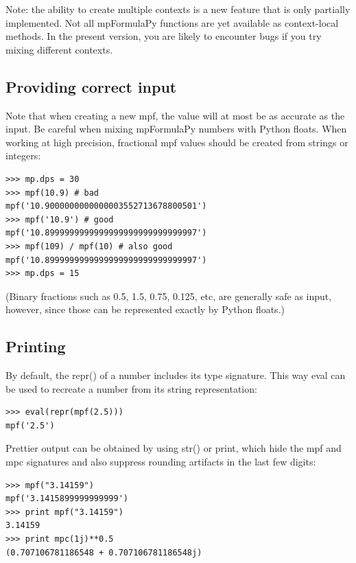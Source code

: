 Note: the ability to create multiple contexts is a new feature that is only partially implemented. Not all mpFormulaPy functions are yet available as context-local methods. In the present version, you are likely to encounter bugs if you try mixing different contexts.


\subsection{Providing correct input}  

Note that when creating a new mpf, the value will at most be as accurate as the input. Be careful when mixing mpFormulaPy numbers with Python floats. When working at high precision, fractional mpf values should be created from strings or integers:

\begin{lstlisting}
>>> mp.dps = 30
>>> mpf(10.9) # bad
mpf('10.9000000000000003552713678800501')
>>> mpf('10.9') # good
mpf('10.8999999999999999999999999999997')
>>> mpf(109) / mpf(10) # also good
mpf('10.8999999999999999999999999999997')
>>> mp.dps = 15
\end{lstlisting}


(Binary fractions such as 0.5, 1.5, 0.75, 0.125, etc, are generally safe as input, however, since those can be represented exactly by Python floats.)


\subsection{Printing}  

By default, the repr() of a number includes its type signature. This way eval can be used to recreate a number from its string representation:

\begin{lstlisting}
>>> eval(repr(mpf(2.5)))
mpf('2.5')
\end{lstlisting}


Prettier output can be obtained by using str() or print, which hide the mpf and mpc signatures and also suppress rounding artifacts in the last few digits:

\begin{lstlisting}
>>> mpf("3.14159")
mpf('3.1415899999999999')
>>> print mpf("3.14159")
3.14159
>>> print mpc(1j)**0.5
(0.707106781186548 + 0.707106781186548j)
\end{lstlisting}


